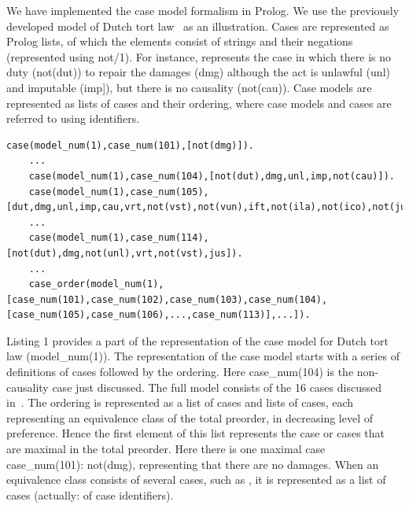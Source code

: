 \documentclass{IOS-Book-Article}
\begin{document}


\noindent We have implemented the case model formalism in Prolog. We use the previously developed model of Dutch tort law~\cite{Verheij2017Formalizing} as an illustration. Cases are represented as Prolog lists, of which the elements consist of strings and their negations (represented using {\mf not/1}). For instance, {} represents the case in which there is no duty ({\mf not(dut)}) to repair the damages ({\mf dmg}) although the act is unlawful ({\mf unl}) and imputable ({\mf imp]}), but there is no causality ({\mf not(cau)}). Case models are represented as lists of cases and their ordering, where case models and cases are referred to using identifiers. 
	\begin{lstlisting}[caption={Definition of the Dutch tort law case model in Prolog},captionpos=b,float]
	case(model_num(1),case_num(101),[not(dmg)]).
	...
	case(model_num(1),case_num(104),[not(dut),dmg,unl,imp,not(cau)]).
	case(model_num(1),case_num(105),[dut,dmg,unl,imp,cau,vrt,not(vst),not(vun),ift,not(ila),not(ico),not(jus),prp]).
	...
	case(model_num(1),case_num(114),[not(dut),dmg,not(unl),vrt,not(vst),jus]).
	...
	case_order(model_num(1),[case_num(101),case_num(102),case_num(103),case_num(104),[case_num(105),case_num(106),...,case_num(113)],...]).
	\end{lstlisting}

Listing 1 provides a part of the representation of the case model for Dutch tort law ({\mf model\_num(1)}). 
The representation of the case model starts with a series of definitions of cases followed by the ordering. Here {\mf case\_num(104)} is the non-causality case just discussed. The full model consists of the 16 cases discussed in~\cite{Verheij2017Formalizing}. The ordering is represented as a list of cases and lists of cases, each representing an equivalence class of the total preorder, in decreasing level of preference. Hence the first element of this list represents the case or cases that are maximal in the total preorder. Here there is one maximal case {\mf case\_num(101): not(dmg)}, representing that there are no damages. When an equivalence class consists of several cases, such as {}, it is represented as a list of cases (actually: of case identifiers).
\end{document}
